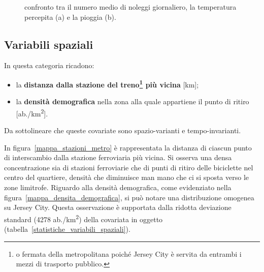 \begin{figure}[htpb]
	\centering
	\quad
	\quad
	\caption[Confronto tra il numero medio di noleggi giornaliero, la temperatura percepita e la pioggia]{confronto tra il numero medio di noleggi giornaliero, la temperatura percepita (a) e la pioggia (b).}
	\label{ritiri_vs_variabili_meteo}
\end{figure}

\subsection[Variabili spaziali]{Variabili spaziali}
In questa categoria ricadono:
\begin{itemize}
	\item la \textbf{distanza dalla stazione del treno\footnote{o fermata della metropolitana poiché Jersey City è servita da entrambi i mezzi di trasporto pubblico.} più vicina} [\unit{\kilo\meter}];
	\item la \textbf{densità demografica} nella zona alla quale appartiene il punto di ritiro [ab./\unit{\kilo\meter\squared}].
\end{itemize}
Da sottolineare che queste covariate sono spazio-varianti e tempo-invarianti.
\par In figura~\ref{mappa_stazioni_metro} è rappresentata la distanza di ciascun punto di interscambio dalla stazione ferroviaria più vicina. Si osserva una densa concentrazione sia di stazioni ferroviarie che di punti di ritiro delle biciclette nel centro del quartiere, densità che diminuisce man mano che ci si sposta verso le zone limitrofe. Riguardo alla densità demografica, come evidenziato nella figura~\ref{mappa_densita_demografica}, si può notare una distribuzione omogenea su Jersey City. Questa osservazione è supportata dalla ridotta deviazione standard (\num{4278} ab./\unit{\kilo\meter\squared}) della covariata in oggetto (tabella~\ref{statistiche_variabili_spaziali}).

